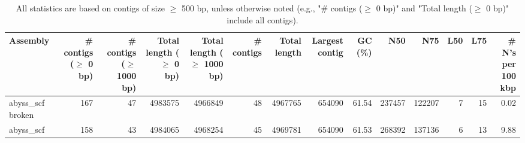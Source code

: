 \documentclass[12pt,a4paper]{article}
\begin{document}
\begin{table}[ht]
\begin{center}
\caption{All statistics are based on contigs of size $\geq$ 500 bp, unless otherwise noted (e.g., "\# contigs ($\geq$ 0 bp)" and "Total length ($\geq$ 0 bp)" include all contigs).}
\begin{tabular}{|l*{13}{|r}|}
\hline
Assembly & \# contigs ($\geq$ 0 bp) & \# contigs ($\geq$ 1000 bp) & Total length ($\geq$ 0 bp) & Total length ($\geq$ 1000 bp) & \# contigs & Total length & Largest contig & GC (\%) & N50 & N75 & L50 & L75 & \# N's per 100 kbp \\ \hline
abyss\_scf broken & 167 & 47 & 4983575 & 4966849 & 48 & 4967765 & 654090 & 61.54 & 237457 & 122207 & 7 & 15 & 0.02 \\ \hline
abyss\_scf & 158 & 43 & 4984065 & 4968254 & 45 & 4969781 & 654090 & 61.53 & 268392 & 137136 & 6 & 13 & 9.88 \\ \hline
\end{tabular}
\end{center}
\end{table}
\end{document}
